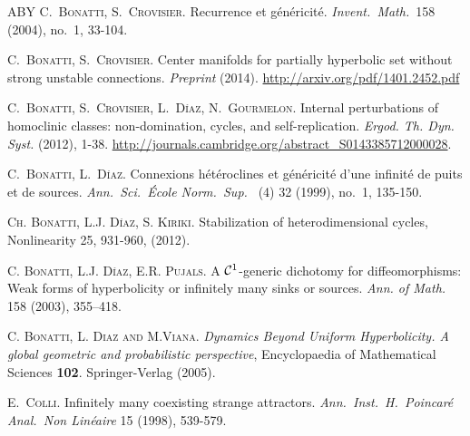 \documentclass[11pt, a4paper]{amsart}
\theoremstyle{plain}
\theoremstyle{definition}
\theoremstyle{remark}
\numberwithin{equation}{section}         %
\begin{document}
\begin{thebibliography}{ABY}
\textsc{C.~Bonatti, S.~Crovisier.}
Recurrence et g\'en\'ericit\'e.  
 \textit{Invent.\ Math.\ }158 (2004), no.~1, 33-104.

\textsc{C.~Bonatti, S.~Crovisier.}
Center manifolds for partially hyperbolic set without strong unstable connections.
\textit{Preprint} (2014).
\newblock \url{http://arxiv.org/pdf/1401.2452.pdf}

\textsc{C.~Bonatti, S.~Crovisier, L.~D\'iaz, N.~Gourmelon.}
Internal perturbations of homoclinic classes: non-domination, cycles, and self-replication.  
\textit{Ergod. Th.  Dyn. Syst.} (2012), 1-38. 
\url{http://journals.cambridge.org/abstract_S0143385712000028}.


%
\textsc{C.~Bonatti, L.~D\'iaz.}
Connexions h\'et\'eroclines et g\'en\'ericit\'e d'une infinit\'e de puits et de sources. 
\textit{Ann.\ Sci.\ \'Ecole Norm.\ Sup.\ } (4) 32 (1999), no.~1, 135-150. 

\textsc{Ch. Bonatti, L.J. D\'\i az, S. Kiriki}. Stabilization of heterodimensional cycles, Nonlinearity 25, 931-960, (2012).

\textsc{C. Bonatti, L.J. D\'\i az, E.R. Pujals.}
A ${\mathcal C}^1$-generic dichotomy for diffeomorphisms: Weak forms
of hyperbolicity or infinitely many sinks or sources.
{\it Ann. of
Math.\ } 158 (2003), 355--418.

\textsc{C. Bonatti, L. Diaz and M.Viana.} \emph{Dynamics Beyond Uniform Hyperbolicity. A global geometric and probabilistic perspective}, Encyclopaedia of Mathematical Sciences {\bf 102}. Springer-Verlag (2005).




\textsc{E.~Colli.}
Infinitely many coexisting strange attractors.
\textit{Ann.\ Inst.\ H.\ Poincar\'e Anal.\ Non Lin\'eaire} 15 (1998), 539-579.




\end{thebibliography}
\end{document}
